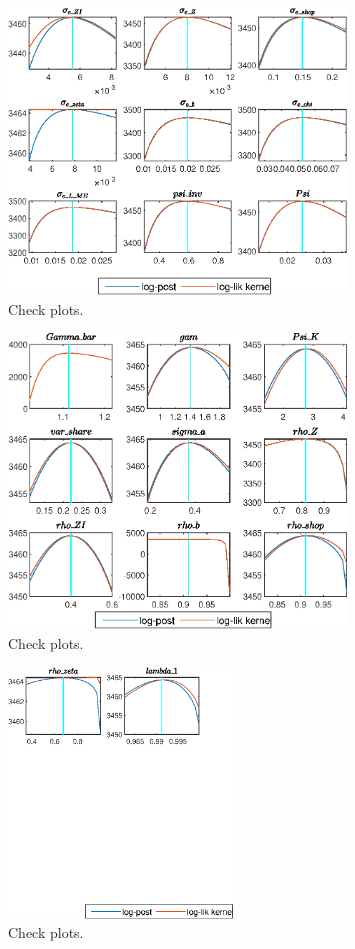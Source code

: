  
\begin{figure}[H]
\centering 
\includegraphics[width=0.80\textwidth]{directed_search/graphs/directed_search_CheckPlots1}
\caption{Check plots.}\label{Fig:CheckPlots:1}
\end{figure}
 
\begin{figure}[H]
\centering 
\includegraphics[width=0.80\textwidth]{directed_search/graphs/directed_search_CheckPlots2}
\caption{Check plots.}\label{Fig:CheckPlots:2}
\end{figure}
 
\begin{figure}[H]
\centering 
\includegraphics[width=0.53\textwidth]{directed_search/graphs/directed_search_CheckPlots3}
\caption{Check plots.}\label{Fig:CheckPlots:3}
\end{figure}
 
